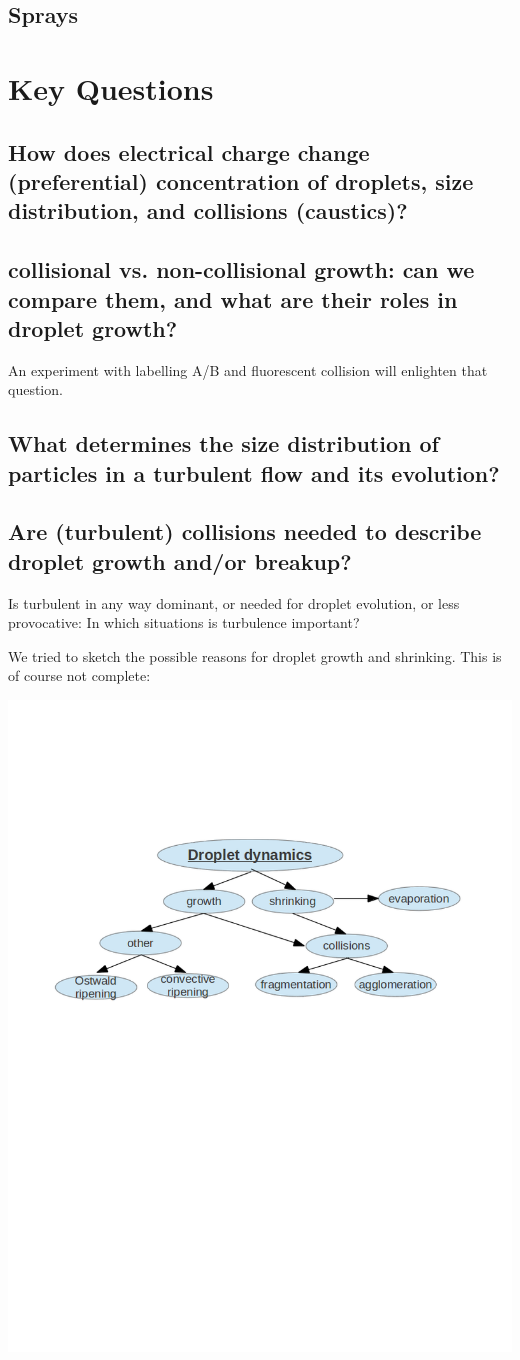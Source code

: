 \documentclass{report}
\begin{document}
\section{Sprays}


\chapter{Key Questions}

\section{How does electrical charge  
change (preferential) concentration of droplets, size distribution, and collisions (caustics)?}

\section{collisional vs. non-collisional growth: can we compare them, and what are their roles in 
droplet growth? }
An experiment with labelling A/B and fluorescent collision will enlighten that question.

\section{What determines the size distribution of particles in a turbulent flow
and its evolution?}

\section{Are (turbulent) collisions needed to describe droplet growth and/or breakup?}
Is turbulent in any way dominant, or needed for droplet evolution, or less provocative: 
In which situations is turbulence important?

We tried to sketch the possible reasons for droplet growth and shrinking.
This is of course not complete:

\includegraphics[width=\textwidth]{droplet_fig1.png}
\end{document}
